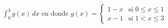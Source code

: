 \item $\displaystyle \int_0^3 g(x) \, dx \text{ en donde } g(x) = \begin{cases} 1 - x & \text{si } 0 \le x \le 1 \\ x - 1 & \text{si } 1 < x \le 3 \end{cases}$
